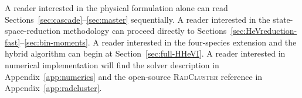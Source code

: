 \documentclass[sn-mathphys-ay,Numbered]{sn-jnl}
\begin{document}
A reader interested in the physical formulation alone can read
Sections~\ref{sec:cascade}--\ref{sec:master} sequentially.
A reader interested in the state-space-reduction methodology can
proceed directly to Sections~\ref{sec:HeVreduction-fast}--\ref{sec:bin-moments}.
A reader interested in the four-species extension and the hybrid
algorithm can begin at Section~\ref{sec:full-HHeVI}.
A reader interested in numerical implementation will find the
solver description in Appendix~\ref{app:numerics} and the open-source
\textsc{RadCluster} reference in Appendix~\ref{app:radcluster}.


\end{document}

